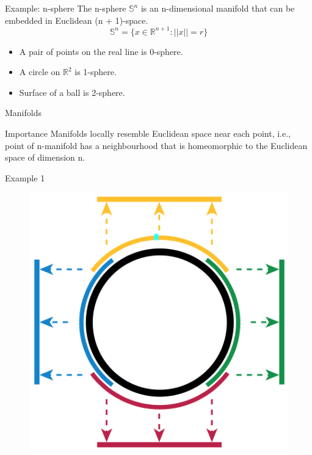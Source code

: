 \documentclass{beamer}
\begin{document}
\begin{frame}{Example: n-sphere}
The n-sphere $\mathbb{S}^{n}$ is an n-dimensional manifold that can be embedded in Euclidean (n + 1)-space.
\begin{equation*}
  \mathbb{S}^{n} = \{x \in \mathbb{R}^{n+1}: ||x|| = r\}
\end{equation*}
\begin{itemize}
  \item A pair of points on the real line is 0-sphere.
  \item A circle on $\mathbb{R}^{2}$ is 1-sphere.
  \item Surface of a ball is 2-sphere.
  \end{itemize}
\end{frame}

\begin{frame}{Manifolds}
\begin{alertblock}{Importance}
Manifolds locally resemble Euclidean space near each point, i.e., point of n-manifold has a neighbourhood that is homeomorphic to the Euclidean space of dimension n.
\end{alertblock}
\end{frame}

\begin{frame}{Example 1}
\begin{figure}
\centering
\includegraphics[scale=0.5]{chart-circle.png}
\end{figure}
\end{frame}
\end{document}

